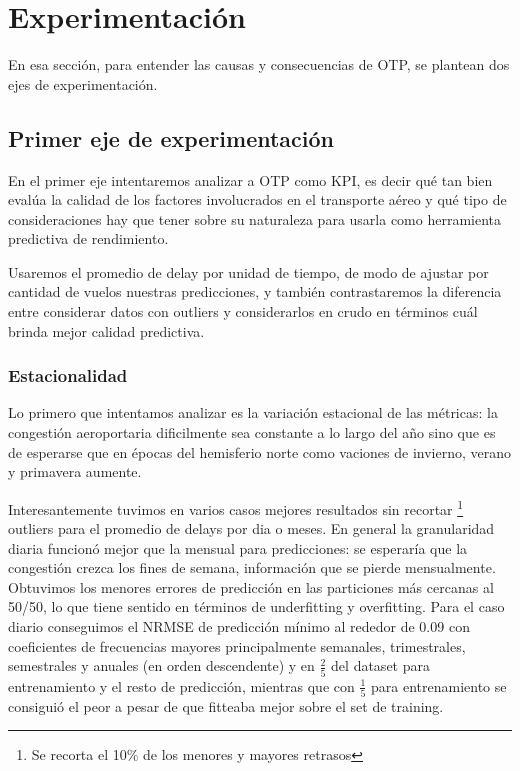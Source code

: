 \section{Experimentación}
En esa sección, para entender las causas y consecuencias de OTP, se plantean dos ejes de experimentación.
\subsection{Primer eje de experimentación}
En el primer eje intentaremos analizar a OTP como KPI, es decir qué tan bien evalúa la calidad de los factores involucrados en el transporte aéreo y qué tipo de consideraciones hay que tener sobre su naturaleza para usarla como herramienta predictiva de rendimiento.

Usaremos el promedio de delay por unidad de tiempo, de modo de ajustar por cantidad de vuelos nuestras predicciones, y también contrastaremos la diferencia entre considerar datos con outliers y considerarlos en crudo en términos cuál brinda mejor calidad predictiva.

\subsubsection{Estacionalidad}
Lo primero que intentamos analizar es la variación estacional de las métricas: la congestión aeroportaria dificilmente sea constante a lo largo del año sino que es de esperarse que en épocas del hemisferio norte como vaciones de invierno, verano y primavera aumente.

Interesantemente tuvimos en varios casos mejores resultados sin recortar \footnote{Se recorta el 10\% de los menores y mayores retrasos} outliers para el promedio de delays por dia o meses. En general la granularidad diaria funcionó mejor que la mensual para predicciones: se esperaría que la congestión crezca los fines de semana, información que se pierde mensualmente. Obtuvimos los menores errores de predicción en las particiones más cercanas al 50/50, lo que tiene sentido en términos de underfitting y overfitting. Para el caso diario conseguimos el NRMSE de predicción mínimo al rededor de 0.09 con coeficientes de frecuencias mayores principalmente semanales, trimestrales, semestrales y anuales (en orden descendente) y en $\frac{2}{5}$ del dataset para entrenamiento y el resto de predicción, mientras que con $\frac{1}{5}$ para entrenamiento se consiguió el peor a pesar de que fitteaba mejor sobre el set de training.



